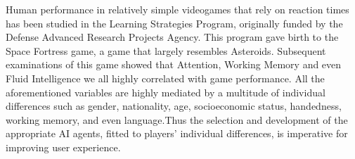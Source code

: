 Human performance in relatively simple videogames that rely on reaction times has been studied in the Learning Strategies Program, originally funded by the Defense Advanced Research Projects Agency\cite{donchin1989learning}. This program gave birth to the Space Fortress game, a game that  largely resembles Asteroids\cite{boot2015video}. Subsequent examinations of this game showed that Attention, Working Memory and even Fluid Intelligence we all highly correlated with game performance\cite{rabbitt1989space}. All the aforementioned variables are highly mediated by a multitude of individual differences such as gender, nationality, age, socioeconomic status, handedness, working memory, and even language\cite{lyle2008handedness}\cite{cazzato2010gender}\cite{stigler1986digit}\cite{templer2014relationship}\cite{greiner2014assessment}.Thus the selection and development of the appropriate AI agents, fitted to players’ individual differences, is imperative for improving user experience. 
